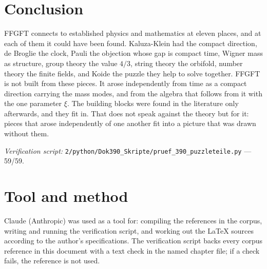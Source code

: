\section{Conclusion}

FFGFT connects to established physics and mathematics at eleven places, and at each of them it could
have been found. Kaluza-Klein had the compact direction, de Broglie the clock, Pauli the objection
whose gap is compact time, Wigner mass as structure, group theory the value $4/3$, string theory the
orbifold, number theory the finite fields, and Koide the puzzle they help to solve together. FFGFT is not
built from these pieces. It arose independently from time as a compact direction carrying the mass
modes, and from the algebra that follows from it with the one parameter $\xi$. The building blocks
were found in the literature only afterwards, and they fit in. That does not speak against the
theory but for it: pieces that arose independently of one another fit into a picture that was
drawn without them.

\vspace{1em}
\noindent\textit{Verification script:} \texttt{2/python/Dok390\_Skripte/pruef\_390\_puzzleteile.py}
--- 59/59.

\section*{Tool and method}

Claude (Anthropic) was used as a tool for: compiling the references in the corpus, writing and
running the verification script, and working out the \LaTeX{} sources according to the author's
specifications. The verification script backs every corpus reference in this document with a text
check in the named chapter file; if a check fails, the reference is not used.

